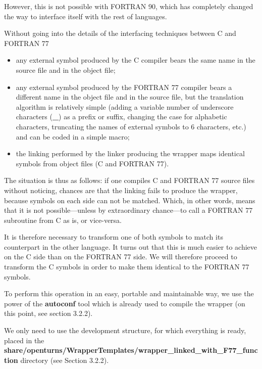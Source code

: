 However, this is not possible with FORTRAN 90, which has completely changed the way to interface itself with the rest of languages.

Without going into the details of the interfacing techniques between C and FORTRAN 77%
\begin{itemize}
\item any external symbol produced by the C compiler bears the same name in the source file and in the object file;
\item any external symbol produced by the FORTRAN 77 compiler bears a different name in the object file and in the source file, but the translation algorithm is relatively simple (adding a variable number of underscore characters ({\bf \_}) as a prefix or suffix, changing the case for alphabetic characters, truncating the names of external symbols to 6 characters, etc.) and can be coded in a simple macro;
\item the linking performed by the linker producing the wrapper maps identical symbols from object files (C and FORTRAN 77).
\end{itemize}

The situation is thus as follows: if one compiles C and FORTRAN 77 source files without noticing, chances are that the linking fails to produce the wrapper, because symbols on each side can not be matched. Which, in other words, means that it is not possible---unless by extraordinary chance---to call a FORTRAN 77 subroutine from C as is, or vice-versa.

It is therefore necessary to transform one of both symbols to match its counterpart in the other language. It turns out that this is much easier to achieve on the C side than on the FORTRAN 77 side. We will therefore proceed to transform the C symbols in order to make them identical to the FORTRAN 77 symbols.

To perform this operation in an easy, portable and maintainable way, we use the power of the {\bf autoconf} tool which is already used to compile the wrapper (on this point, see section 3.2.2).

We only need to use the development structure, for which everything is ready, placed in the {\bf  share/openturns/WrapperTemplates/wrapper\_linked\_with\_F77\_function} directory (see Section 3.2.2).

